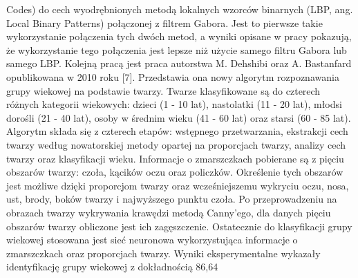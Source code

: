 Codes) do cech wyodrębnionych metodą lokalnych wzorców binarnych (LBP, ang. Local Binary Patterns) połączonej z filtrem Gabora. Jest to pierwsze takie wykorzystanie połączenia tych dwóch metod, a wyniki opisane w pracy pokazują, że wykorzystanie tego połączenia jest lepsze niż użycie samego filtru Gabora lub samego LBP. Kolejną pracą jest praca autorstwa M. Dehshibi oraz A. Bastanfard opublikowana w 2010 roku [7]. Przedstawia ona nowy algorytm rozpoznawania grupy wiekowej na podstawie twarzy. Twarze klasyfikowane są do czterech różnych kategorii wiekowych: dzieci (1 - 10 lat), nastolatki (11 - 20 lat), młodsi dorośli (21 - 40 lat), osoby w średnim wieku (41 - 60 lat) oraz starsi (60 - 85 lat). Algorytm składa się z czterech etapów: wstępnego przetwarzania, ekstrakcji cech twarzy według nowatorskiej metody opartej na proporcjach twarzy, analizy cech twarzy oraz klasyfikacji wieku. Informacje o zmarszczkach pobierane są z pięciu obszarów twarzy: czoła, kącików oczu oraz policzków. Określenie tych obszarów jest możliwe dzięki proporcjom twarzy oraz wcześniejszemu wykryciu oczu, nosa, ust, brody, boków twarzy i najwyższego punktu czoła. Po przeprowadzeniu na obrazach twarzy wykrywania krawędzi metodą Canny’ego, dla danych pięciu obszarów twarzy obliczone jest ich zagęszczenie. Ostatecznie do klasyfikacji grupy wiekowej stosowana jest sieć neuronowa wykorzystująca informacje o zmarszczkach oraz proporcjach twarzy. Wyniki eksperymentalne wykazały identyfikację grupy wiekowej z dokładnością 86,64%